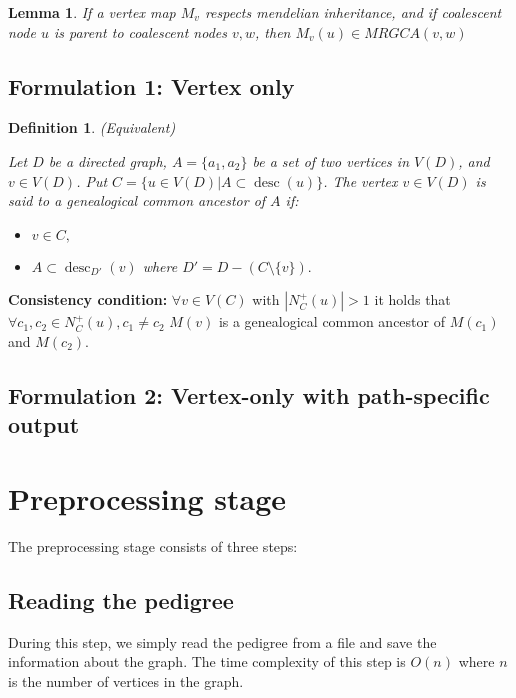 \documentclass[14pt]{extarticle}
\DeclareMathOperator{\desc}{desc}
\newtheorem{definition}{Definition}
\newtheorem{lemma}{Lemma}
\begin{document}
\begin{lemma}
If a vertex map $M_v$ respects mendelian inheritance, and if coalescent node $u$ is parent to coalescent nodes $v, w$, then $M_v(u) \in MRGCA(v,w)$   
\end{lemma}



 

\subsection{Formulation 1: Vertex only} 

\begin{definition} (Equivalent)
	
	Let $D$ be a directed graph, $A = \{a_1,  a_2\}$ be a set of two vertices in $V(D)$, and $v \in V(D)$. Put $C = \{u \in V(D) | A \subset \desc(u) \}$. The vertex $v \in V(D)$ is said to a genealogical common ancestor of $A$ if:
	
	\begin{itemize}
		\item 
		$v \in C,$
		\item 
		$A \subset \desc_{D'}(v)$ where $D' = D -  (C \setminus \{v\}).$
	\end{itemize}
	
\end{definition}



\textbf{Consistency condition:}  $\forall v \in V(C)$ with $|N^{+}_C(u)| > 1$ it holds that $\forall c_1, c_2 \in N^{+}_C(u), c_1 \ne c_2$ $M(v)$ is a genealogical common ancestor of $M(c_1)$ and $M(c_2)$.


\subsection{Formulation 2: Vertex-only with path-specific output}

\section{Preprocessing stage}

The preprocessing stage consists of three steps:

\subsection{Reading the pedigree}

During this step, we simply read the pedigree from a file and save the information about the graph. The time complexity of this step is $O(n)$ where $n$ is the number of vertices in the graph.
\end{document}
